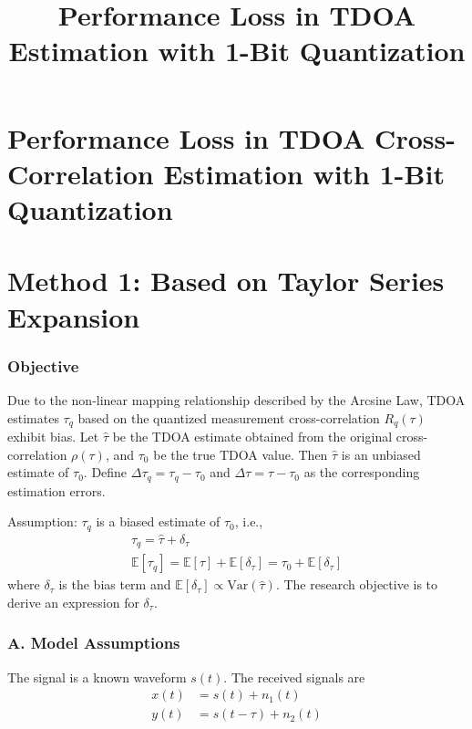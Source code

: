 \documentclass{article}
\title{Performance Loss in TDOA Estimation with 1-Bit Quantization}
\author{}
\date{}
\begin{document}
	
	\maketitle
	
	\section*{Performance Loss in TDOA Cross-Correlation Estimation with 1-Bit Quantization}
	
	\section*{Method 1: Based on Taylor Series Expansion}
	
	\subsubsection*{Objective}
	Due to the non-linear mapping relationship described by the Arcsine Law, TDOA estimates $\tau_q$ based on the quantized measurement cross-correlation $R_q(\tau)$ exhibit bias. Let $\hat{\tau}$ be the TDOA estimate obtained from the original cross-correlation $\rho(\tau)$, and $\tau_0$ be the true TDOA value. Then $\hat{\tau}$ is an unbiased estimate of $\tau_0$. Define $\Delta \tau_q = \tau_q - \tau_0$ and $\Delta \tau = \hat{\tau} - \tau_0$ as the corresponding estimation errors.
	
	Assumption: $\tau_q$ is a biased estimate of $\tau_0$, i.e.,
	\begin{gather}
		\tau_q = \hat{\tau} + \delta_\tau  \\
		\mathbb{E}[\tau_q] = \mathbb{E}[\hat{\tau}] + \mathbb{E}[\delta_\tau] = \tau_0 + \mathbb{E}[\delta_\tau] 
	\end{gather}
	where $\delta_\tau$ is the bias term and $\mathbb{E}[\delta_\tau] \propto \text{Var}(\hat{\tau})$. The research objective is to derive an expression for $\delta_\tau$.
	
	\subsubsection*{A. Model Assumptions}
	The signal is a known waveform $s(t)$. The received signals are
	\begin{equation}
		\begin{aligned}
			x(t) &= s(t) + n_1(t) \\
			y(t) &= s(t - \tau) + n_2(t)
		\end{aligned}
	\end{equation}
	
\end{document}
